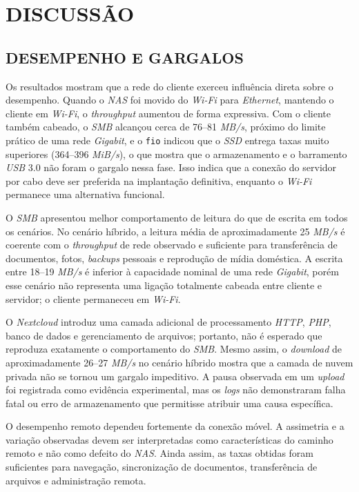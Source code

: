 
\chapter{DISCUSSÃO}
\label{cap:discussao}

\section{DESEMPENHO E GARGALOS}

Os resultados mostram que a rede do cliente exerceu influência direta sobre o desempenho. Quando o \textit{NAS} foi movido do \textit{Wi-Fi} para \textit{Ethernet}, mantendo o cliente em \textit{Wi-Fi}, o \textit{throughput} aumentou de forma expressiva. Com o cliente também cabeado, o \textit{SMB} alcançou cerca de 76--81 \textit{MB/s}, próximo do limite prático de uma rede \textit{Gigabit}, e o \texttt{fio} indicou que o \textit{SSD} entrega taxas muito superiores (364--396 \textit{MiB/s}), o que mostra que o armazenamento e o barramento \textit{USB} 3.0 não foram o gargalo nessa fase. Isso indica que a conexão do servidor por cabo deve ser preferida na implantação definitiva, enquanto o \textit{Wi-Fi} permanece uma alternativa funcional.

O \textit{SMB} apresentou melhor comportamento de leitura do que de escrita em todos os cenários. No cenário híbrido, a leitura média de aproximadamente 25 \textit{MB/s} é coerente com o \textit{throughput} de rede observado e suficiente para transferência de documentos, fotos, \textit{backups} pessoais e reprodução de mídia doméstica. A escrita entre 18--19 \textit{MB/s} é inferior à capacidade nominal de uma rede \textit{Gigabit}, porém esse cenário não representa uma ligação totalmente cabeada entre cliente e servidor; o cliente permaneceu em \textit{Wi-Fi}.

O \textit{Nextcloud} introduz uma camada adicional de processamento \textit{HTTP}, \textit{PHP}, banco de dados e gerenciamento de arquivos; portanto, não é esperado que reproduza exatamente o comportamento do \textit{SMB}. Mesmo assim, o \textit{download} de aproximadamente 26--27 \textit{MB/s} no cenário híbrido mostra que a camada de nuvem privada não se tornou um gargalo impeditivo. A pausa observada em um \textit{upload} foi registrada como evidência experimental, mas os \textit{logs} não demonstraram falha fatal ou erro de armazenamento que permitisse atribuir uma causa específica.

O desempenho remoto dependeu fortemente da conexão móvel. A assimetria e a variação observadas devem ser interpretadas como características do caminho remoto e não como defeito do \textit{NAS}. Ainda assim, as taxas obtidas foram suficientes para navegação, sincronização de documentos, transferência de arquivos e administração remota.

